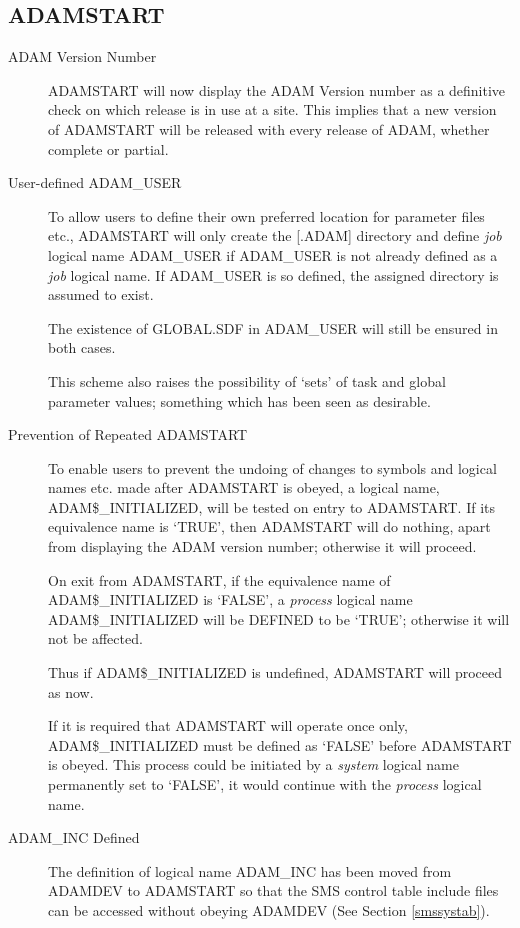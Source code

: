 \subsection{ADAMSTART}
\begin{description}
\item[ADAM Version Number]
ADAMSTART will now display the ADAM Version number as a definitive check on
which release is in use at a site.
This implies that a new version of ADAMSTART will be released with every
release of ADAM, whether complete or partial.

\item[User-defined ADAM\_USER]
To allow users to define their own preferred location for parameter files etc.,
ADAM\-START will only create the [.ADAM] directory and define {\em job} logical 
name ADAM\-\_USER if ADAM\-\_USER is not already defined as a {\em job} logical 
name.
If ADAM\_USER is so defined, the assigned directory is assumed to exist.

The existence of GLOBAL.SDF in ADAM\_USER will still be ensured in both cases.

This scheme also raises the possibility of `sets' of task and global parameter
values; something which has been seen as desirable.

\item[Prevention of Repeated ADAMSTART]
To enable users to prevent the undoing of changes to symbols and logical names
etc. made after ADAM\-START is obeyed, a logical name, ADAM\$\_INITIAL\-IZED,
will be tested on entry to ADAMSTART.
If its equivalence name is `TRUE', then ADAM\-START will do nothing, apart from
displaying the ADAM version number; otherwise it will proceed.

On exit from ADAMSTART, if the equivalence name of ADAM\$\-\_INITIAL\-IZED is
`FALSE', a {\em process} logical name ADAM\$\-\_INITIALIZED will be DEFINED to
be `TRUE'; otherwise it will not be affected.

Thus if ADAM\$\-\_INITIAL\-IZED is undefined, ADAMSTART will proceed as now.

If it is required that ADAMSTART will operate once only, 
ADAM\$\-\_INITIAL\-IZED must be defined as `FALSE' before ADAMSTART is obeyed.
This process could be initiated by a {\em system} logical name permanently set 
to `FALSE', it would continue with the {\em process} logical name.

\item[ADAM\_INC Defined]
The definition of logical name ADAM\_INC has been moved from ADAMDEV to
ADAMSTART so that the SMS control table include files can be accessed without
obeying ADAMDEV (See Section \ref{smssystab}).
\end{description}

